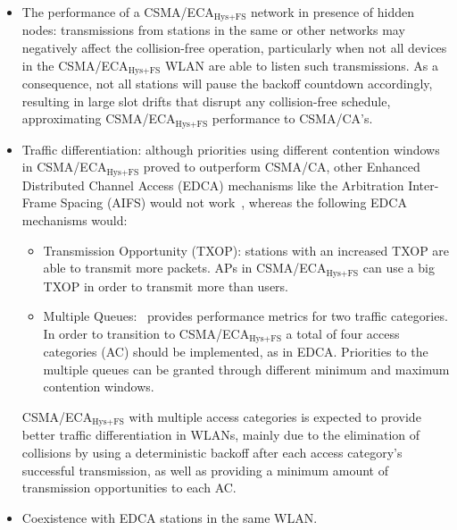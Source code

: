 \begin{itemize}
	\item The performance of a CSMA/ECA$_{\text{Hys+FS}}$ network in presence of hidden nodes: transmissions from stations in the same or other networks may negatively affect the collision-free operation, particularly when not all devices in the CSMA/ECA$_{\text{Hys+FS}}$ WLAN are able to listen such transmissions. As a consequence, not all stations will pause the backoff countdown accordingly, resulting in large slot drifts that disrupt any collision-free schedule, approximating CSMA/ECA$_{\text{Hys+FS}}$ performance to CSMA/CA's. 

	
	\item Traffic differentiation: although priorities using different contention windows in CSMA/ECA$_{\text{Hys+FS}}$ proved to outperform CSMA/CA, other Enhanced Distributed Channel Access (EDCA) mechanisms like the Arbitration Inter-Frame Spacing (AIFS) would not work~\cite{jaumeTD}, whereas the following EDCA mechanisms would:
	\begin{itemize}
		\item Transmission Opportunity (TXOP): stations with an increased TXOP are able to transmit more packets. APs in CSMA/ECA$_{\text{Hys+FS}}$ can use a big TXOP in order to transmit more than users.
		\item Multiple Queues:~\cite{jaumeTD} provides performance metrics for two traffic categories. In order to transition to CSMA/ECA$_{\text{Hys+FS}}$ a total of four access categories (AC) should be implemented, as in EDCA. Priorities to the multiple queues can be granted through different minimum and maximum contention windows.
	\end{itemize}
	CSMA/ECA$_{\text{Hys+FS}}$ with multiple access categories is expected to provide better traffic differentiation in WLANs, mainly due to the elimination of collisions by using a deterministic backoff after each access category's successful transmission, as well as providing a minimum amount of transmission opportunities to each AC.
	\item Coexistence with EDCA stations in the same WLAN.
\end{itemize}